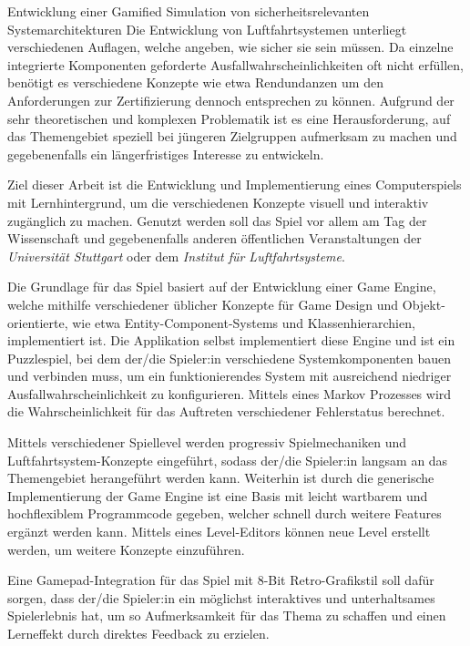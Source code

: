 
{\LARGE Entwicklung einer Gamified Simulation von sicherheitsrelevanten Systemarchitekturen}
Die Entwicklung von Luftfahrtsystemen unterliegt verschiedenen Auflagen, welche angeben, wie sicher sie sein müssen.
Da einzelne integrierte Komponenten geforderte Ausfallwahrscheinlichkeiten oft nicht erfüllen, benötigt es verschiedene
Konzepte wie etwa Rendundanzen um den Anforderungen zur Zertifizierung dennoch entsprechen zu können.
Aufgrund der sehr theoretischen und komplexen Problematik ist es eine Herausforderung, auf das Themengebiet speziell bei
jüngeren Zielgruppen aufmerksam zu machen und gegebenenfalls ein längerfristiges Interesse zu entwickeln.

Ziel dieser Arbeit ist die Entwicklung und Implementierung eines Computerspiels mit Lernhintergrund,
um die verschiedenen Konzepte visuell und interaktiv zugänglich zu machen.
Genutzt werden soll das Spiel vor allem am Tag der Wissenschaft und gegebenenfalls anderen öffentlichen Veranstaltungen der \textit{Universität Stuttgart}
oder dem \textit{Institut für Luftfahrtsysteme}.

Die Grundlage für das Spiel basiert auf der Entwicklung einer Game Engine, welche mithilfe verschiedener üblicher Konzepte
für Game Design und Objekt-orientierte, wie etwa Entity-Component-Systems und Klassenhierarchien, implementiert ist.
Die Applikation selbst implementiert diese Engine und ist ein Puzzlespiel, bei dem der/die Spieler:in verschiedene Systemkomponenten bauen und verbinden
muss, um ein funktionierendes System mit ausreichend niedriger Ausfallwahrscheinlichkeit zu konfigurieren.
Mittels eines Markov Prozesses wird die Wahrscheinlichkeit für das Auftreten verschiedener Fehlerstatus berechnet.

Mittels verschiedener Spiellevel werden progressiv Spielmechaniken und Luftfahrtsystem-Konzepte eingeführt, sodass
der/die Spieler:in langsam an das Themengebiet herangeführt werden kann.
Weiterhin ist durch die generische Implementierung der Game Engine ist eine Basis mit leicht wartbarem und hochflexiblem
Programmcode gegeben, welcher schnell durch weitere Features ergänzt werden kann.
Mittels eines Level-Editors können neue Level erstellt werden, um weitere Konzepte einzuführen.

Eine Gamepad-Integration für das Spiel mit 8-Bit Retro-Grafikstil soll dafür sorgen, dass der/die Spieler:in ein
möglichst interaktives und unterhaltsames Spielerlebnis hat, um so Aufmerksamkeit für das Thema zu schaffen und
einen Lerneffekt durch direktes Feedback zu erzielen.
